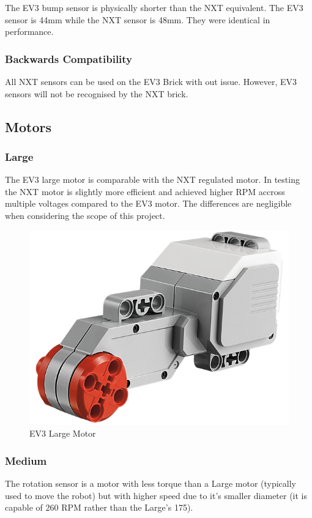 \documentclass[11pt, a4paper, oneside]{article}
\begin{document}
 		The EV3 bump sensor is physically shorter than the NXT equivalent. The EV3 sensor is 44mm while the NXT sensor is 48mm. They were identical in performance.  		
  		
  		
  		\subsubsection{Backwards Compatibility}
  		All NXT sensors can be used on the EV3 Brick with out issue. However, EV3 sensors will not be recognised by the NXT brick.

	\subsection{Motors}
		\subsubsection{Large}
		The EV3 large motor is comparable with the NXT regulated motor. In testing the NXT motor is slightly more efficient and achieved higher RPM accross multiple voltages compared to the EV3 motor. The differences are negligible when considering the scope of this project. 
		\begin{figure}[h!]
	  	\centering
	  	\includegraphics[scale=0.45]{img/EV3LargeMotor.png}
		\caption{EV3 Large Motor}
		\end{figure}		
		


		\subsubsection{Medium}
		The rotation sensor is a motor with less torque than a Large motor (typically used to move the robot) but with higher speed due to it's smaller diameter (it is capable of 260 RPM rather than the Large’s 175). \\
\end{document}
